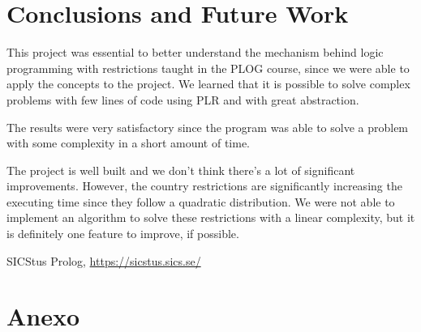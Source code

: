 \documentclass[runningheads,a4paper]{llncs}
\begin{document}
\section{Conclusions and Future Work}
This project was essential to better understand the mechanism behind logic programming with restrictions taught in the PLOG course, since we were able to apply the concepts to the project. We learned that it is possible to solve complex problems with few lines of code using PLR and with great abstraction.

The results were very satisfactory since the program was able to solve a problem with some complexity in a short amount of time.

The project is well built and we don't think there's a lot of significant improvements. However, the country restrictions are significantly increasing the executing time since they follow a quadratic distribution. We were not able to implement an algorithm to solve these restrictions with a linear complexity, but it is definitely one feature to improve, if possible.

\begin{thebibliography}{4}
	
	 SICStus Prolog, \url{https://sicstus.sics.se/}
	
\end{thebibliography}  

\clearpage
\section{Anexo}
\end{document}
